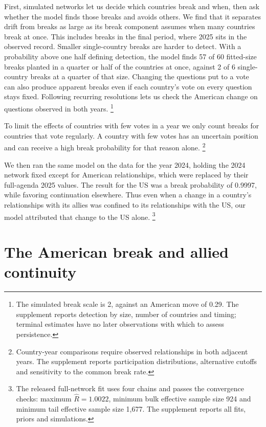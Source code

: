 \documentclass[12pt,authoryear]{elsarticle}
\begin{document}
First, simulated networks let us decide which countries break and when, then ask whether the model finds those breaks and avoids others. We find that it separates drift from breaks as large as its break component assumes when many countries break at once. This includes breaks in the final period, where 2025 sits in the observed record. Smaller single-country breaks are harder to detect. With a probability above one half defining detection, the model finds 57 of 60 fitted-size breaks planted in a quarter or half of the countries at once, against 2 of 6 single-country breaks at a quarter of that size. Changing the questions put to a vote can also produce apparent breaks even if each country's vote on every question stays fixed. Following recurring resolutions lets us check the American change on questions observed in both years. \footnote{The simulated break scale is 2, against an American move of 0.29. The supplement reports detection by size, number of countries and timing; terminal estimates have no later observations with which to assess persistence.}

To limit the effects of countries with few votes in a year we only count breaks for countries that vote regularly. A country with few votes has an uncertain position and can receive a high break probability for that reason alone. \footnote{Country-year comparisons require observed relationships in both adjacent years. The supplement reports participation distributions, alternative cutoffs and sensitivity to the common break rate.}

We then ran the same model on the data for the year 2024, holding the 2024 network fixed except for American relationships, which were replaced by their full-agenda 2025 values. The result for the US was a break probability of 0.9997, while favoring continuation elsewhere. Thus even when a change in a country's relationships with its allies was confined to its relationships with the US, our model attributed that change to the US alone. \footnote{The released full-network fit uses four chains and passes the convergence checks: maximum $\widehat R=1.0022$, minimum bulk effective sample size 924 and minimum tail effective sample size 1,677. The supplement reports all fits, priors and simulations.}

\section{The American break and allied continuity}
\label{sec:break}
\end{document}
